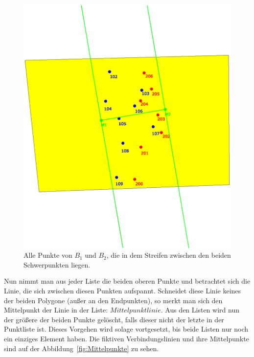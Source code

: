 \begin{figure}
	\centering
	\includegraphics[scale=0.6]{RectDist.eps}
	\caption[Punkte mit einem rechtwinkeligen Abstand zur Schwerpunktlinie]{Alle Punkte von $B_1$ und $B_2$, die in dem Streifen zwischen den beiden Schwerpunkten liegen.}
	\label{fig:RectDist}		
\end{figure}


Nun nimmt man aus jeder Liste die beiden oberen Punkte und betrachtet sich die Linie, die sich zwischen diesen Punkten aufspannt. Schneidet diese Linie keines der beiden Polygone (außer an den Endpunkten), so merkt man sich den Mittelpunkt der Linie in der Liste: $Mittelpunktlinie$. Aus den Listen wird nun der größere der beiden Punkte gelöscht, falls dieser nicht der letzte in der Punktliste ist. Dieses Vorgehen wird solage vortgesetzt, bis beide Listen nur noch ein einziges Element haben. Die fiktiven Verbindungslinien und ihre Mittelpunkte sind auf der Abbildung~\ref{fig:Mittelpunkte} zu sehen.


